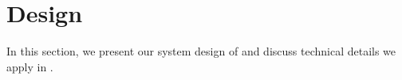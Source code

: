\section{Design}\label{sec:design}

In this section, we present our system design of \sysname and discuss technical details we apply in \sysname.

%
%
%


